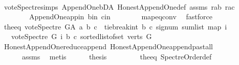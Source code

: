 \begin{isabellebody}
\ \ \ \ \ \ \isamarkupfalse%
\ vote{\isacharunderscore}{\kern0pt}Spectre{\isachardot}{\kern0pt}simps\ Append{\isacharunderscore}{\kern0pt}One{\isachardot}{\kern0pt}bD{\isacharunderscore}{\kern0pt}A\ Honest{\isacharunderscore}{\kern0pt}Append{\isacharunderscore}{\kern0pt}One{\isacharunderscore}{\kern0pt}def\ assms\ r{\isacharunderscore}{\kern0pt}ab\ r{\isacharunderscore}{\kern0pt}ac\ \isanewline
\ \ \ \ \ \ \ \ Append{\isacharunderscore}{\kern0pt}One{\isachardot}{\kern0pt}app{\isacharunderscore}{\kern0pt}in\ b{\isacharunderscore}{\kern0pt}in\ c{\isacharunderscore}{\kern0pt}in\isanewline
\ \ \ \ \ \ \ \ map{\isacharunderscore}{\kern0pt}eq{\isacharunderscore}{\kern0pt}conv\ \isamarkupfalse%
\ fastforce\ \isanewline
\ \ \ \ \isamarkupfalse%
\ \isamarkupfalse%
\ the{\isacharunderscore}{\kern0pt}eq{\isacharcolon}{\kern0pt}\ {\isachardoublequoteopen}vote{\isacharunderscore}{\kern0pt}Spectre\ G{\isacharunderscore}{\kern0pt}A\ a\ b\ c\ {\isacharequal}{\kern0pt}\ {\isacharparenleft}{\kern0pt}tie{\isacharunderscore}{\kern0pt}break{\isacharunderscore}{\kern0pt}int\ b\ c\ {\isacharparenleft}{\kern0pt}signum\ {\isacharparenleft}{\kern0pt}sum{\isacharunderscore}{\kern0pt}list\ {\isacharparenleft}{\kern0pt}map\ {\isacharparenleft}{\kern0pt}{\isasymlambda}i{\isachardot}{\kern0pt}\isanewline
\ \ \ {\isacharparenleft}{\kern0pt}vote{\isacharunderscore}{\kern0pt}Spectre\ G\ i\ b\ c{\isacharparenright}{\kern0pt}{\isacharparenright}{\kern0pt}\ {\isacharparenleft}{\kern0pt}sorted{\isacharunderscore}{\kern0pt}list{\isacharunderscore}{\kern0pt}of{\isacharunderscore}{\kern0pt}set\ {\isacharparenleft}{\kern0pt}verts\ G{\isacharparenright}{\kern0pt}{\isacharparenright}{\kern0pt}{\isacharparenright}{\kern0pt}{\isacharparenright}{\kern0pt}{\isacharparenright}{\kern0pt}{\isacharparenright}{\kern0pt}{\isachardoublequoteclose}\isanewline
\ \ \ \ \ \ \isamarkupfalse%
\ Honest{\isacharunderscore}{\kern0pt}Append{\isacharunderscore}{\kern0pt}One{\isachardot}{\kern0pt}reduce{\isacharunderscore}{\kern0pt}append\ Honest{\isacharunderscore}{\kern0pt}Append{\isacharunderscore}{\kern0pt}One{\isachardot}{\kern0pt}append{\isacharunderscore}{\kern0pt}past{\isacharunderscore}{\kern0pt}all\ \isanewline
\ \ \ \ \ \ assms{\isacharparenleft}{\kern0pt}{}{\isacharparenright}{\kern0pt}\ \isamarkupfalse%
\ metis\isanewline
\ \ \ \ \isamarkupfalse%
\ {\isacharquery}{\kern0pt}thesis\ \isanewline
\ \ \ \ \ \ \isamarkupfalse%
\ the{\isacharunderscore}{\kern0pt}eq\ Spectre{\isacharunderscore}{\kern0pt}Order{\isacharunderscore}{\kern0pt}def\ \isamarkupfalse%

\end{isabellebody}
